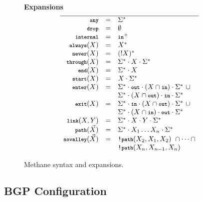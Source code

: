 \documentclass[twocolumn]{sig-alternate-10pt}
\newcommand{\KW}[1]{\texttt{\small\bfseries{#1}}}
\newcommand{\Any}{\KW{any}}
\newcommand{\None}{\KW{drop}}
\newcommand{\In}{\KW{in}}
\newcommand{\Out}{\KW{out}}
\newcommand{\NOT}{\texttt{!}}
\newcommand{\Exit}{\KW{exit}}
\newcommand{\End}{\KW{end}}
\newcommand{\Start}{\KW{start}}
\newcommand{\Enter}{\KW{enter}}
\newcommand{\Internal}{\KW{internal}}
\newcommand{\Never}{\KW{never}}
\newcommand{\Always}{\KW{always}}
\newcommand{\Through}{\KW{through}}
\newcommand{\LinkKW}{\KW{link}}
\newcommand{\PathKW}{\KW{path}}
\newcommand{\Novalley}{\KW{novalley}}
\newcommand{\hdr}[2]{\flushleft \chdr{\hspace{5mm}#1}{#2}}
\newcommand{\chdr}[2]{\textbf{#1} {#2} \\ \centering}%
\begin{document}
\begin{figure*}[h!]
\begin{minipage}[t]{.45\linewidth}
  \end{minipage}
  ~~
  \vrule
  ~~
  \begin{minipage}[t]{.5\linewidth}\small
  \hdr{Expansions}{}
  \vspace*{-1\baselineskip}
  \[\begin{array}{rcl}
    \hline
    \Any               & = & \Sigma^* \\
    \None              & = & \emptyset \\
    \Internal          & = & \In^+ \\
    \Always(X)         & = & X^* \\
    \Never(X)          & = & (!X)^* \\
    \Through(X)        & = & \Sigma^* \cdot X \cdot \Sigma^* \\
    \End(X)            & = & \Sigma^* \cdot X \\
    \Start(X)          & = & X \cdot \Sigma^* \\
    \Enter(X)          & = & \Sigma^* \cdot \Out \cdot (X \cap \In) \cdot \Sigma^* ~ \cup \\
                       &   & \Sigma^* \cdot (X \cap \Out) \cdot \In \cdot \Sigma^* \\
    \Exit(X)           & = & \Sigma^* \cdot \In \cdot (X \cap \Out) \cdot \Sigma^* ~ \cup \\
                       &   & \Sigma^* \cdot (X \cap \In) \cdot \Out \cdot \Sigma^* \\
    \LinkKW(X,Y)       & = & \Sigma^* \cdot X \cdot Y \cdot \Sigma^* \\
    \PathKW(\vec{X})   & = & \Sigma^* \cdot X_1 \dots X_n \cdot \Sigma^* \\
    \Novalley(\vec{X}) & = & \NOT\PathKW(X_2,X_1,X_2) ~ \cap \dots \cap \\
                       &   & \NOT\PathKW(X_n,X_{n-1},X_n) \\
  \end{array} \]%

  \end{minipage}%

  \hrulefill%
  \vspace{1em}

  \caption{Methane syntax and expansions.}
  \label{fig:syntax}
\end{figure*}%



\subsection{BGP Configuration}
\end{document}
